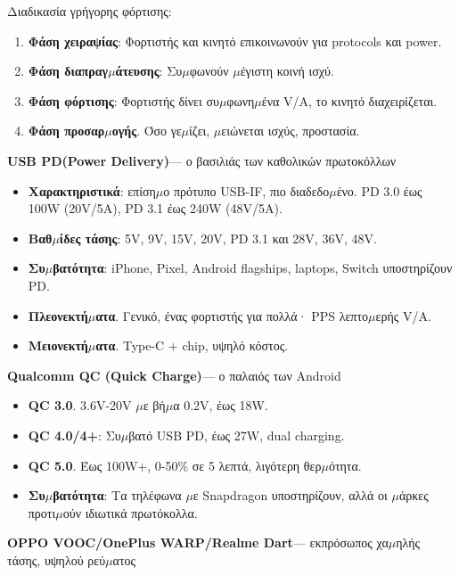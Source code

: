 Διαδικασία γρήγορης φόρτισης:

\begin{enumerate}
  \item \textbf{Φάση χειραψίας}: Φορτιστής και κινητό επικοινωνούν για protocols και power.
  \item \textbf{Φάση διαπραγ$\mu$άτευσης}: Συ$\mu$φωνούν $\mu$έγιστη κοινή ισχύ.
  \item \textbf{Φάση φόρτισης}: Φορτιστής δίνει συ$\mu$φωνη$\mu$ένα V/A, το κινητό διαχειρίζεται.
  \item \textbf{Φάση προσαρ$\mu$ογής}. Όσο γε$\mu$ίζει, $\mu$ειώνεται ισχύς, προστασία.
\end{enumerate}


\textbf{USB PD(Power Delivery)}— ο βασιλιάς των καθολικών πρωτοκόλλων

\begin{itemize}
  \item \textbf{Χαρακτηριστικά}: επίση$\mu$ο πρότυπο USB-IF, πιο διαδεδο$\mu$ένο. PD 3.0 έως 100W (20V/5A), PD 3.1 έως 240W (48V/5A).
  \item \textbf{Βαθ$\mu$ίδες τάσης}: 5V, 9V, 15V, 20V, PD 3.1 και 28V, 36V, 48V.
  \item \textbf{Συ$\mu$βατότητα}: iPhone, Pixel, Android flagships, laptops, Switch υποστηρίζουν PD.
  \item \textbf{Πλεονεκτή$\mu$ατα}. Γενικό, ένας φορτιστής για πολλά· PPS λεπτο$\mu$ερής V/A.
  \item \textbf{Μειονεκτή$\mu$ατα}. Type-C + chip, υψηλό κόστος.
\end{itemize}

\textbf{Qualcomm QC (Quick Charge)}— ο παλαιός των Android

\begin{itemize}
  \item \textbf{QC 3.0}. 3.6V-20V $\mu$ε βή$\mu$α 0.2V, έως 18W.
  \item \textbf{QC 4.0/4+}: Συ$\mu$βατό USB PD, έως 27W, dual charging.
  \item \textbf{QC 5.0}. Έως 100W+, 0-50\% σε 5 λεπτά, λιγότερη θερ$\mu$ότητα.
  \item \textbf{Συ$\mu$βατότητα}: Τα τηλέφωνα $\mu$ε Snapdragon υποστηρίζουν, αλλά οι $\mu$άρκες προτι$\mu$ούν ιδιωτικά πρωτόκολλα.
\end{itemize}

\textbf{OPPO VOOC/OnePlus WARP/Realme Dart}— εκπρόσωπος χα$\mu$ηλής τάσης, υψηλού ρεύ$\mu$ατος

